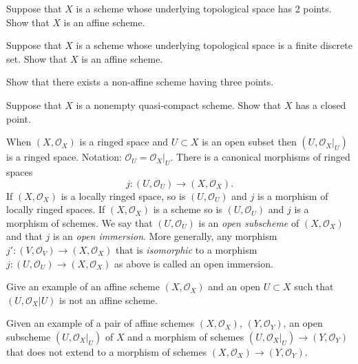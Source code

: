 \begin{exercise}
\label{exercise-two-points}
Suppose that $X$ is a scheme whose underlying
topological space has 2 points. Show that $X$ is an affine scheme.
\end{exercise}

\begin{exercise}
\label{exercise-discrete-finite-set-points}
Suppose that $X$ is a scheme whose underlying topological space is a
finite discrete set. Show that $X$ is an affine scheme.
\end{exercise}

\begin{exercise}
\label{exercise-three-points}
Show that there exists a non-affine scheme having three points.
\end{exercise}

\begin{exercise}
\label{exercise-quasi-compact-closed-point}
Suppose that $X$ is a nonempty quasi-compact scheme.
Show that $X$ has a closed point.
\end{exercise}

\begin{remark}
\label{remark-open-immersion}
When $(X, {\mathcal O}_X)$ is a ringed space and $U \subset X$
is an open subset then $(U, {\mathcal O}_X|_U)$ is a ringed space. Notation:
${\mathcal O}_U = {\mathcal O}_X|_U$. There is a canonical morphisms
of ringed spaces
$$
j : (U, {\mathcal O}_U) \longrightarrow (X, {\mathcal O}_X).
$$
If $(X, {\mathcal O}_X)$ is a locally ringed space, so is
$(U, {\mathcal O}_U)$ and
$j$ is a morphism of locally ringed spaces. If $(X, {\mathcal O}_X)$
is a scheme
so is $(U, {\mathcal O}_U)$ and $j$ is a morphism of schemes. We say
that
$(U, {\mathcal O}_U)$ is an {\it open subscheme} of $(X, {\mathcal O}_X)$
and that
$j$ is an {\it open immersion}. More generally, any morphism
$j' : (V, {\mathcal O}_V) \to (X, {\mathcal O}_X)$ that is {\it isomorphic}
to a
morphism $j : (U, {\mathcal O}_U) \to (X, {\mathcal O}_X)$ as above is
called an
open immersion.
\end{remark}

\begin{exercise}
\label{exercise-open-affine-not-affine}
Give an example of an affine scheme $(X, {\mathcal O}_X)$
and an open $U \subset X$ such that $(U, {\mathcal O}_X|U)$ is not an affine
scheme.
\end{exercise}

\begin{exercise}
\label{exercise-morphism-does-not-extend}
Given an example of a pair of affine schemes
$(X, {\mathcal O}_X)$, $(Y, {\mathcal O}_Y)$,
an open subscheme $(U, {\mathcal O}_X|_U)$
of $X$ and a morphism of schemes
$(U, {\mathcal O}_X|_U) \to (Y, {\mathcal O}_Y)$
that does not extend to a morphism of schemes
$(X, {\mathcal O}_X) \to (Y, {\mathcal O}_Y)$.
\end{exercise}

